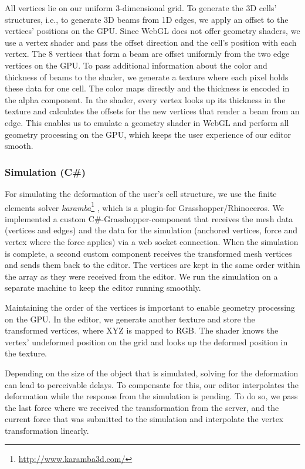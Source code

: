 All vertices lie on our uniform 3-dimensional grid. To generate the 3D cells' structures, i.e., to generate 3D beams from 1D edges, we apply an offset to the vertices’ positions on the GPU. Since WebGL does not offer geometry shaders, we use a vertex shader and pass the offset direction and the cell’s position with each vertex. The 8 vertices that form a beam are offset uniformly from the two edge vertices on the GPU. To pass additional information about the color and thickness of beams to the shader, we generate a texture where each pixel holds these data for one cell. The color maps directly and the thickness is encoded in the alpha component. In the shader, every vertex looks up its thickness in the texture and calculates the offsets for the new vertices that render a beam from an edge. This enables us to emulate a geometry shader in WebGL and perform all geometry processing on the GPU, which keeps the user experience of our editor smooth.

\subsubsection{Simulation (C\#)}
For simulating the deformation of the user’s cell structure, we use the finite elements solver \textit{karamba}\footnote{\url{http://www.karamba3d.com/}} \cite{Preisinger2013}, which is a plugin-for Grasshopper/Rhinoceros. We implemented a custom C\#-Grasshopper-component that receives the mesh data (vertices and edges) and the data for the simulation (anchored vertices, force and vertex where the force applies) via a web socket connection. When the simulation is complete, a second custom component receives the transformed mesh vertices and sends them back to the editor. The vertices are kept in the same order within the array as they were received from the editor. We run the simulation on a separate machine to keep the editor running smoothly. 

Maintaining the order of the vertices is important to enable geometry processing on the GPU. In the editor, we generate another texture and store the transformed vertices, where XYZ is mapped to RGB. The shader knows the vertex' undeformed position on the grid and looks up the deformed position in the texture.

Depending on the size of the object that is simulated, solving for the deformation can lead to perceivable delays. To compensate for this, our editor interpolates the deformation while the response from the simulation is pending. To do so, we pass the last force where we received the transformation from the server, and the current force that was submitted to the simulation and interpolate the vertex transformation linearly.

